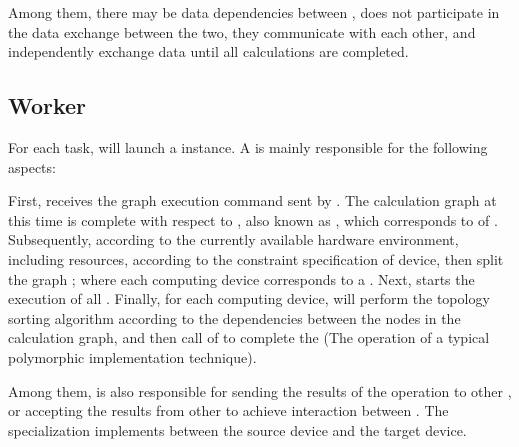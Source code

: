 \begin{content}
Among them, there may be data dependencies between ,  does not participate in the data exchange between the two, they communicate with each other, and independently exchange data until all calculations are completed.


\subsection{Worker}
For each task, \tf{} will launch a  instance. A  is mainly responsible for the following  aspects:

\begin{enum}
\end{enum}

First,  receives the graph execution command sent by . The calculation graph at this time is complete with respect to , also known as , which corresponds to  of . Subsequently,  according to the currently available hardware environment, including  resources, according to the constraint specification of  device, then split the graph  ; where each computing device corresponds to a . Next,  starts the execution of all . Finally, for each computing device,  will perform the topology sorting algorithm according to the dependencies between the nodes in the calculation graph, and then call  of  to complete the  (The operation of a typical polymorphic implementation technique).

Among them,  is also responsible for sending the results of the  operation to other , or accepting the results from other  to achieve  interaction between . The \tf{} specialization implements  between the source device and the target device.


\end{content}
